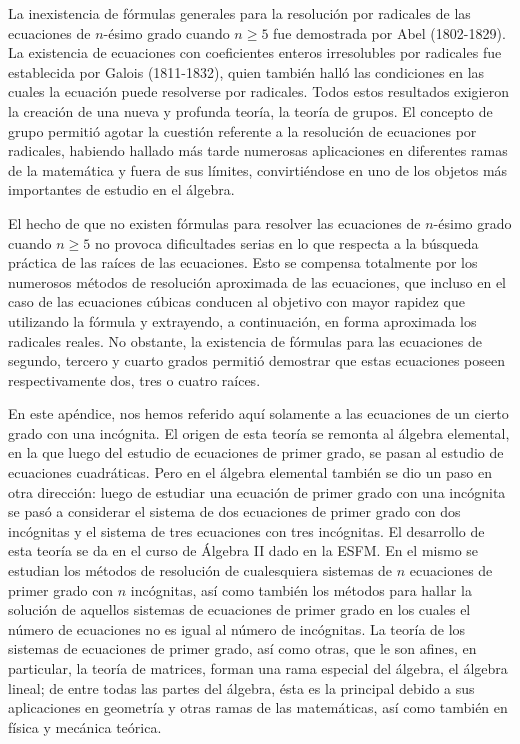 La inexistencia de fórmulas generales para la resolución por radicales de las ecuaciones de $n$-ésimo grado cuando $n \geq 5$ fue demostrada por Abel (1802-1829). La existencia de ecuaciones con coeficientes enteros irresolubles por radicales fue establecida por Galois (1811-1832), quien también halló las condiciones en las cuales la ecuación puede resolverse por radicales. Todos estos resultados exigieron la creación de una nueva y profunda teoría, la teoría de grupos. El concepto de grupo permitió agotar la cuestión referente a la resolución de ecuaciones por radicales, habiendo hallado más tarde numerosas aplicaciones en diferentes ramas de la matemática y fuera de sus límites, convirtiéndose en uno de los objetos más importantes de estudio en el álgebra.

El hecho de que no existen fórmulas para resolver las ecuaciones de $n$-ésimo grado cuando $n \geq 5$ no provoca dificultades serias en lo que respecta a la búsqueda práctica de las raíces de las ecuaciones. Esto se compensa totalmente por los numerosos métodos de resolución aproximada de las ecuaciones, que incluso en el caso de las ecuaciones cúbicas conducen al objetivo con mayor rapidez que utilizando la fórmula y extrayendo, a continuación, en forma aproximada los radicales reales. No obstante, la existencia de fórmulas para las ecuaciones de segundo, tercero y cuarto grados permitió demostrar que estas ecuaciones poseen respectivamente dos, tres o cuatro raíces.

En este apéndice, nos hemos referido aquí solamente a las ecuaciones de un cierto grado con una incógnita. El origen de esta teoría se remonta al álgebra elemental, en la que luego del estudio de ecuaciones de primer grado, se pasan al estudio de ecuaciones cuadráticas. Pero en el álgebra elemental también se dio un paso en otra dirección: luego de estudiar una ecuación de primer grado con una incógnita se pasó a considerar el sistema de dos ecuaciones de primer grado con dos incógnitas y el sistema de tres ecuaciones con tres incógnitas. El desarrollo de esta teoría se da en el curso de Álgebra II dado en la ESFM. En el mismo se estudian los métodos de resolución de cualesquiera sistemas de $n$ ecuaciones de primer grado con $n$ incógnitas, así como también los métodos para hallar la solución de aquellos sistemas de ecuaciones de primer grado en los cuales el número de ecuaciones no es igual al número de incógnitas. La teoría de los sistemas de ecuaciones de primer grado, así como otras, que le son afines, en particular, la teoría de matrices, forman una rama especial del álgebra, el álgebra lineal; de entre todas las partes del álgebra, ésta es la principal debido a sus aplicaciones en geometría y otras ramas de las matemáticas, así como también en física y mecánica teórica.

